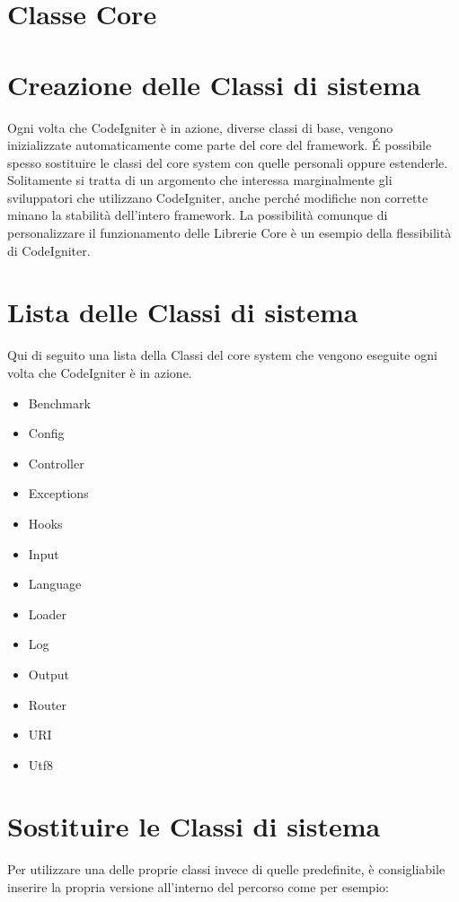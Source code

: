 \section{Classe Core}
\label{cap:classecore}

\section*{Creazione delle Classi di sistema}
Ogni volta che CodeIgniter è in azione, diverse classi di base, vengono inizializzate automaticamente come parte del core del framework. \'E possibile spesso sostituire le classi del core system con quelle personali oppure estenderle. Solitamente si tratta di un argomento che interessa marginalmente gli sviluppatori che utilizzano CodeIgniter, anche perché modifiche non corrette minano la stabilità dell'intero framework. La possibilità comunque di personalizzare il funzionamento delle Librerie Core è un esempio della flessibilità di CodeIgniter.

\section*{Lista delle Classi di sistema}
Qui di seguito una lista della Classi del core system che vengono eseguite ogni volta che CodeIgniter è in azione.

\begin{itemize}
\item Benchmark
\item Config
\item Controller
\item Exceptions
\item Hooks
\item Input
\item Language
\item Loader
\item Log
\item Output
\item Router
\item URI
\item Utf8
\end{itemize}

\section*{Sostituire le Classi di sistema}
Per utilizzare una delle proprie classi invece di quelle predefinite, è consigliabile inserire la propria versione all'interno del percorso  come per esempio:


